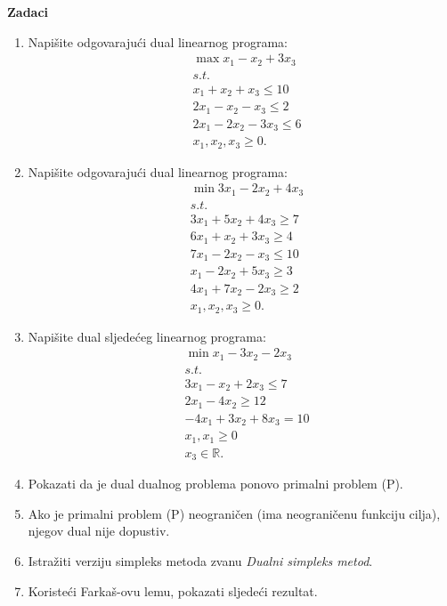 \documentclass[a4paper, utf8, 11pt, colorlinks]{book}
\begin{document}
\vspace{1.5cm}
\textbf{\large Zadaci}
\begin{enumerate}
	\item %
	Napišite odgovarajući dual linearnog programa:
	\begin{align*}
		 &\max x_1 - x_2 + 3 x_3 \\
		 & s.t. \\
		 & x_1 + x_2 + x_3 \leq 10 \\
		 & 2x_1 - x_2 - x_3 \leq 2 \\
		 & 2x_1 - 2x_2 - 3 x_3 \leq 6 \\
		 & x_1, x_2, x_3 \geq 0.
	\end{align*}
 \item    	Napišite odgovarajući dual linearnog programa:
      \begin{align*}
      	  &\min 3 x_1 - 2 x_2 + 4 x_3 \\
      	  & s.t. \\
      	  & 3x_1 + 5 x_2 + 4 x_3 \geq 7 \\
      	  & 6 x_1 + x_2 + 3 x_3 \geq 4 \\
      	  & 7 x_1 - 2 x_2 - x_3 \leq 10 \\
      	  & x_1 - 2 x_2 + 5 x_3 \geq 3 \\
      	  & 4 x_1 + 7 x_2 - 2 x_3 \geq 2 \\
      	  & x_1, x_2, x_3 \geq 0.
      \end{align*}
  \item Napišite dual sljedećeg linearnog programa:
  \begin{align*}
        &\min x_1 - 3 x_2 - 2 x_3 \\
        & s.t. \\
        & 3 x_1 - x_2 + 2 x_3 \leq 7 \\
        & 2 x_1 - 4 x_2 \geq 12 \\
        & -4x_1 + 3x_2 + 8 x_3 = 10 \\
        & x_1, x_1 \geq 0 \\
        & x_3 \in \mathbb{R}. 
  \end{align*}
\item %
Pokazati da je dual dualnog problema ponovo primalni problem (P).
\item Ako je primalni problem (P) neograničen (ima neograničenu funkciju cilja), njegov dual nije dopustiv.
\item Istražiti verziju simpleks metoda zvanu \emph{Dualni simpleks metod}.
\item Koristeći Farkaš-ovu lemu, pokazati sljedeći rezultat. 
 

\end{enumerate}
\end{document}
